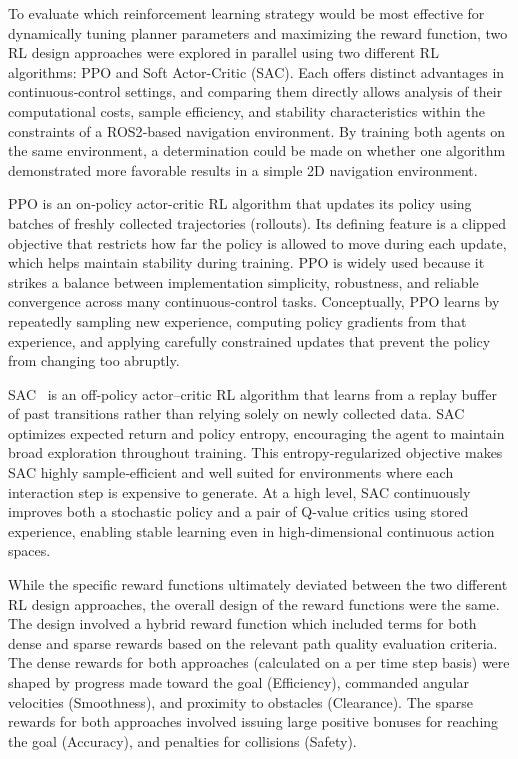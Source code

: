 \documentclass[conference]{IEEEtran}
\begin{document}
        To evaluate which reinforcement learning strategy would be most effective for dynamically tuning planner parameters and maximizing the reward function, two RL design approaches were explored in parallel using two different RL algorithms: PPO and Soft Actor-Critic (SAC). Each offers distinct advantages in continuous‑control settings, and comparing them directly allows analysis of their computational costs, sample efficiency, and stability characteristics within the constraints of a ROS2‑based navigation environment. By training both agents on the same environment, a determination could be made on whether one algorithm demonstrated more favorable results in a simple 2D navigation environment.  
        
        PPO is an on‑policy actor-critic RL algorithm that updates its policy using batches of freshly collected trajectories (rollouts). Its defining
        feature is a clipped objective that restricts how far the policy is allowed to move during each update, which helps maintain stability during
        training. PPO is widely used because it strikes a balance between implementation simplicity, robustness, and reliable convergence across many
        continuous‑control tasks. Conceptually, PPO learns by repeatedly sampling new experience, computing policy gradients from that experience,
        and applying carefully constrained updates that prevent the policy from changing too abruptly.
        
        SAC~\cite{b11} is an off‑policy actor–critic RL algorithm that learns from a replay buffer of past transitions rather than relying solely on
        newly collected data. SAC optimizes expected return and policy entropy, encouraging the agent to maintain broad exploration throughout training. This entropy‑regularized objective makes SAC highly sample‑efficient and well suited for environments where each interaction step is expensive to generate. At a high level, SAC continuously improves both a stochastic policy and a pair of Q‑value critics using stored experience, enabling stable learning even in high‑dimensional continuous action spaces.

        While the specific reward functions ultimately deviated between the two different RL design approaches, the overall design of the reward
        functions were the same. The design involved a hybrid reward function which included terms for both dense and sparse rewards based on the
        relevant path quality evaluation criteria. The dense rewards for both approaches (calculated on a per time step basis) were shaped by progress
        made toward the goal (Efficiency), commanded angular velocities (Smoothness), and proximity to obstacles (Clearance). The sparse rewards for both
        approaches involved issuing large positive bonuses for reaching the goal (Accuracy), and penalties for collisions (Safety).
\end{document}
